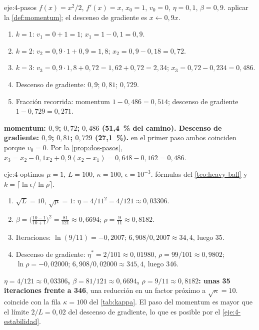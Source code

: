 \begin{solucion}{eje:4-pasos}
\datos $f(x)=x^{2}/2$, $f'(x)=x$, $x_0=1$, $v_0=0$, $\eta=0{,}1$, $\beta=0{,}9$.
\planteamiento aplicar la \cref{def:momentum}; el descenso de gradiente es $x\leftarrow 0{,}9x$.
\pasos
\begin{enumerate}[label=\arabic*.]
  \item $k=1$: $v_1=0+1=1$; $x_1=1-0{,}1=0{,}9$.
  \item $k=2$: $v_2=0{,}9\cdot 1+0{,}9=1{,}8$; $x_2=0{,}9-0{,}18=0{,}72$.
  \item $k=3$: $v_3=0{,}9\cdot 1{,}8+0{,}72=1{,}62+0{,}72=2{,}34$; $x_3=0{,}72-0{,}234=0{,}486$.
  \item Descenso de gradiente: $0{,}9$; $0{,}81$; $0{,}729$.
  \item Fracción recorrida: momentum $1-0{,}486=0{,}514$; descenso de gradiente $1-0{,}729=0{,}271$.
\end{enumerate}
\resultado \textbf{momentum: $0{,}9$; $0{,}72$; $0{,}486$ (51,4~\% del camino). Descenso de gradiente: $0{,}9$; $0{,}81$; $0{,}729$ (27,1~\%).}
\comprobacion en el primer paso ambos coinciden porque $v_0=0$. Por la \cref{prop:dos-pasos}, $x_3=x_2-0{,}1x_2+0{,}9(x_2-x_1)=0{,}648-0{,}162=0{,}486$.
\end{solucion}

\begin{solucion}{eje:4-optimos}
\datos $\mu=1$, $L=100$, $\kappa=100$, $\epsilon=10^{-3}$.
\planteamiento fórmulas del \cref{teo:heavy-ball} y $k=\lceil\ln\epsilon/\ln\rho\rceil$.
\pasos
\begin{enumerate}[label=\arabic*.]
  \item $\sqrt L=10$, $\sqrt\mu=1$: $\eta=4/11^{2}=4/121\approx 0{,}03306$.
  \item $\beta=\bigl(\frac{10-1}{10+1}\bigr)^{2}=\frac{81}{121}\approx 0{,}6694$; $\rho=\frac{9}{11}\approx 0{,}8182$.
  \item Iteraciones: $\ln(9/11)=-0{,}2007$; $6{,}908/0{,}2007\approx 34{,}4$, luego 35.
  \item Descenso de gradiente: $\eta^{\ast}=2/101\approx 0{,}01980$, $\rho=99/101\approx 0{,}9802$; $\ln\rho=-0{,}02000$; $6{,}908/0{,}02000\approx 345{,}4$, luego 346.
\end{enumerate}
\resultado \textbf{$\eta=4/121\approx 0{,}03306$, $\beta=81/121\approx 0{,}6694$, $\rho=9/11\approx 0{,}8182$: unas 35 iteraciones frente a 346}, una reducción en un factor próximo a $\sqrt\kappa=10$.
\comprobacion coincide con la fila $\kappa=100$ del \cref{tab:kappa}. El paso del momentum es mayor que el límite $2/L=0{,}02$ del descenso de gradiente, lo que es posible por el \cref{eje:4-estabilidad}.
\end{solucion}


